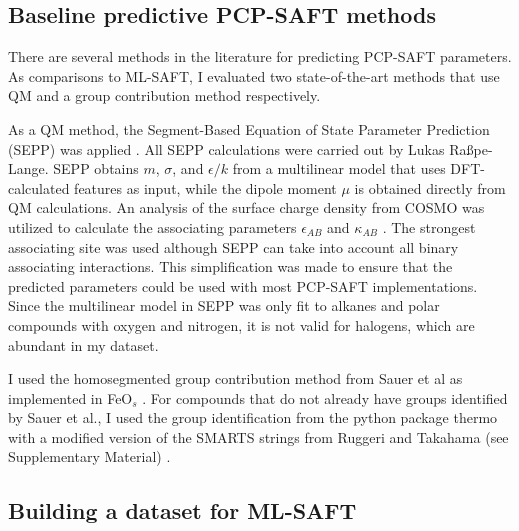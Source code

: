 





\subsection{Baseline predictive PCP-SAFT methods}\label{sec:baselines}

There are several methods in the literature for predicting PCP-SAFT parameters. As comparisons to ML-SAFT, I evaluated two state-of-the-art methods that use QM and a group contribution method respectively.

As a QM method, the Segment-Based Equation of State Parameter Prediction (SEPP) was applied \cite{Kaminski2020}. All SEPP calculations were carried out by Lukas Ra{\ss}pe-Lange. SEPP obtains $m$, $\sigma$, and $\epsilon/k$ from a multilinear model that uses DFT-calculated features as input, while the dipole moment $\mu$ is obtained directly from QM calculations. An analysis of the surface charge density from COSMO was utilized to calculate the associating parameters $\epsilon_{AB}$ and $\kappa_{AB}$ \cite{Klamt1995}. The strongest associating site was used although SEPP can take into account all binary associating interactions. This simplification was made to ensure that the predicted parameters could be used with most PCP-SAFT implementations. Since the multilinear model in SEPP was only fit to alkanes and polar compounds with oxygen and nitrogen, it is not valid for halogens, which are abundant in my dataset.

I used the homosegmented group contribution method from Sauer et al \cite{Sauer2014} as implemented in FeO$_{s}$ \cite{Rehner2023}. For compounds that do not already have groups identified by Sauer et al., I used the group identification from the python package thermo \cite{thermopython} with a modified version of the SMARTS strings from Ruggeri and Takahama (see Supplementary Material) \cite{Ruggeri2016}.

\subsection{Building a dataset for ML-SAFT}\label{subsec:data_set}


